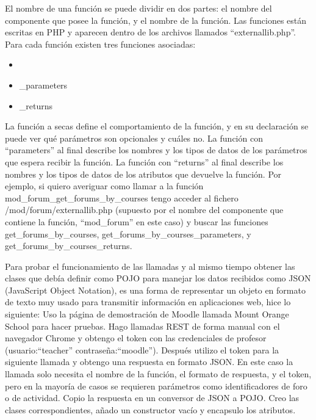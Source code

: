El nombre de una función se puede dividir en dos partes: el nombre del componente que posee la función, y el nombre de la función. Las funciones están escritas en PHP y aparecen dentro de los archivos llamados ``externallib.php''. Para cada función existen tres funciones asociadas: 
\begin{itemize}
	\item <NOMBRE DE LA FUNCIÓN>
	\item <NOMBRE DE LA FUNCIÓN>\_parameters
	\item <NOMBRE DE LA FUNCIÓN>\_returns
\end{itemize}
La función a secas define el comportamiento de la función, y en su declaración se puede ver qué parámetros son opcionales y cuáles no.
La función con ``parameters'' al final describe los nombres y los tipos de datos de los parámetros que espera recibir la función.
La función con ``returns'' al final describe los nombres y los tipos de datos de los atributos que devuelve la función.
Por ejemplo, si quiero averiguar como llamar a la función mod\_forum\_get\_forums\_by\_courses
tengo acceder al fichero /mod/forum/externallib.php (supuesto por el nombre del componente que contiene la función, ``mod\_forum'' en este caso) y buscar las funciones get\_forums\_by\_courses, get\_forums\_by\_courses\_parameters, y get\_forums\_by\_courses\_returns.

Para probar el funcionamiento de las llamadas y al mismo tiempo obtener las clases que debía definir como POJO para manejar los datos recibidos como JSON (JavaScript Object Notation), es una forma de representar un objeto en formato de texto muy usado para transmitir información en aplicaciones web, hice lo siguiente:
Uso la página de demostración de Moodle llamada Mount Orange School para hacer pruebas.
Hago llamadas REST de forma manual con el navegador Chrome y obtengo el token con las credenciales de profesor (usuario:``teacher'' contraseña:``moodle''). Después utilizo el token para la siguiente llamada y obtengo una respuesta en formato JSON. En este caso la llamada solo necesita el nombre de la función, el formato de respuesta, y el token, pero en la mayoría de casos se requieren parámetros como identificadores de foro o de actividad.  Copio la respuesta en un conversor de JSON a POJO. Creo las clases correspondientes, añado un constructor vacío y encapsulo los atributos. 


